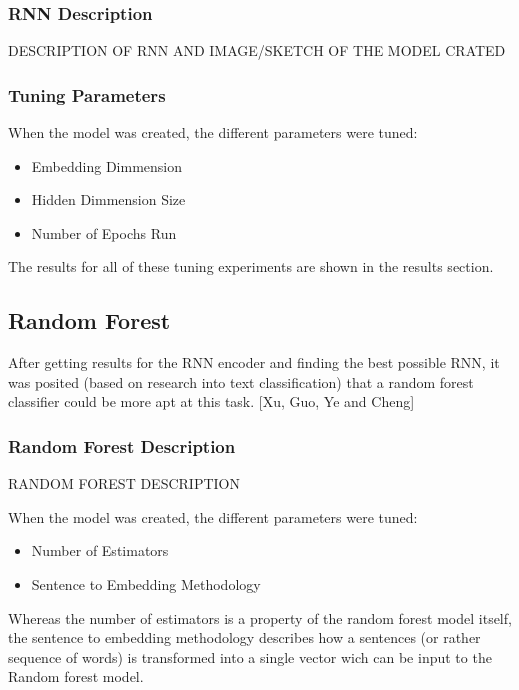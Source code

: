 \documentclass[twoside,twocolumn]{article}
\begin{document}
\subsubsection{RNN Description}

DESCRIPTION OF RNN AND IMAGE/SKETCH OF THE MODEL CRATED

\subsubsection{Tuning Parameters}

When the model was created, the different parameters were tuned:
\begin{itemize}
  \item{Embedding Dimmension}
  \item{Hidden Dimmension Size}
  \item{Number of Epochs Run}
\end{itemize}

The results for all of these tuning experiments are shown in the results section.


\subsection{Random Forest}

After getting results for the RNN encoder and finding the best possible RNN,
it was posited (based on research into text classification) that a random
forest classifier could be more apt at this task. [Xu, Guo, Ye and Cheng]

\subsubsection{Random Forest Description}

RANDOM FOREST DESCRIPTION

When the model was created, the different parameters were tuned:

\begin{itemize}
  \item{Number of Estimators}
  \item{Sentence to Embedding Methodology} 
\end{itemize}

Whereas the number of estimators is a property of the random forest model itself,
the sentence to embedding methodology describes how a sentences (or rather sequence of words)
is transformed into a single vector wich can be input to the Random forest model.
\end{document}
